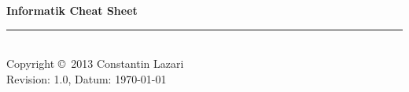 \documentclass[10pt,landscape]{scrartcl}
\begin{document}
	\raggedright
	\footnotesize
	\begin{multicols}{3}


	\setlength{\premulticols}{1pt}
	\setlength{\postmulticols}{1pt}
	\setlength{\multicolsep}{1pt}
	\setlength{\columnsep}{2pt}
	\newlength{\MyLenA}
	\newlength{\MyLenB}

	\begin{center}
	\Large{\textbf{Informatik Cheat Sheet}} \\
	\end{center}

	
	\newpage
	

	
	
	\rule{0.3\linewidth}{0.25pt}\\
	\scriptsize
	Copyright \copyright\ 2013 Constantin Lazari\\
	Revision: 1.0, Datum: \today\\
	\end{multicols}
\end{document}
